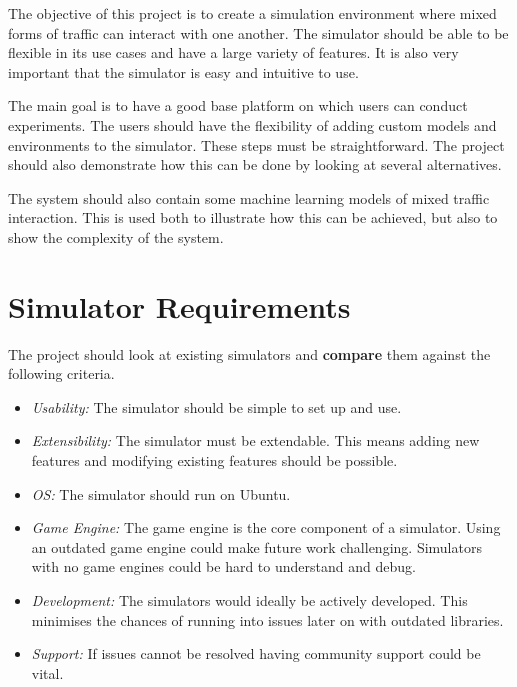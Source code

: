 The objective of this project is to create a simulation environment where mixed forms of traffic can interact with one another. The simulator should be able to be flexible in its use cases and have a large variety of features. It is also very important that the simulator is easy and intuitive to use.  

The main goal is to have a good base platform on which users can conduct experiments. The users should have the flexibility of adding custom models and environments to the simulator. These steps must be straightforward. The project should also demonstrate how this can be done by looking at several alternatives. 

The system should also contain some machine learning models of mixed traffic interaction. This is used both to illustrate how this can be achieved, but also to show the complexity of the system. 

\section{Simulator Requirements}\label{simRequirements}
The project should look at existing simulators and \textbf{compare} them against the following criteria.
\begin{itemize}
    \item \emph{Usability:} The simulator should be simple to set up and use.
    \item \emph{Extensibility:} The simulator must be extendable. This means adding new features and modifying existing features should be possible. 
    \item \emph{OS:} The simulator should run on Ubuntu.
    \item \emph{Game Engine:} The game engine is the core component of a simulator. Using an outdated game engine could make future work challenging. Simulators with no game engines could be hard to understand and debug. 
    \item \emph{Development:} The simulators would ideally be actively developed. This minimises the chances of running into issues later on with outdated libraries. 
    \item \emph{Support:} If issues cannot be resolved having community support could be vital.
\end{itemize}
\\~\\
